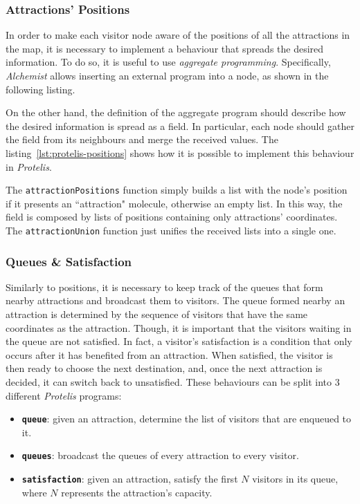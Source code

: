 \subsubsection{Attractions' Positions}
In order to make each visitor node aware of the positions of all the attractions in the map, it is necessary to implement a behaviour that spreads the desired information.
To do so, it is useful to use \textit{aggregate programming}.
Specifically, \textit{Alchemist} allows inserting an external program into a node, as shown in the following listing.



On the other hand, the definition of the aggregate program should describe how the desired information is spread as a field.
In particular, each node should gather the field from its neighbours and merge the received values.
The listing~\ref{lst:protelis-positions} shows how it is possible to implement this behaviour in \textit{Protelis}.



The \texttt{attractionPositions} function simply builds a list with the node's position if it presents an ``attraction" molecule, otherwise an empty list.
In this way, the field is composed by lists of positions containing only attractions' coordinates.
The \texttt{attractionUnion} function just unifies the received lists into a single one.

\subsubsection{Queues \& Satisfaction}
Similarly to positions, it is necessary to keep track of the queues that form nearby attractions and broadcast them to visitors.
The queue formed nearby an attraction is determined by the sequence of visitors that have the same coordinates as the attraction.
Though, it is important that the visitors waiting in the queue are not satisfied.
In fact, a visitor's satisfaction is a condition that only occurs after it has benefited from an attraction.
When satisfied, the visitor is then ready to choose the next destination, and, once the next attraction is decided, it can switch back to unsatisfied.
These behaviours can be split into 3 different \textit{Protelis} programs:
\begin{itemize}
  \item \textbf{\texttt{queue}}: given an attraction, determine the list of visitors that are enqueued to it.
  \item \textbf{\texttt{queues}}: broadcast the queues of every attraction to every visitor.
  \item \textbf{\texttt{satisfaction}}: given an attraction, satisfy the first $N$ visitors in its queue, where $N$ represents the attraction's capacity.
\end{itemize}


